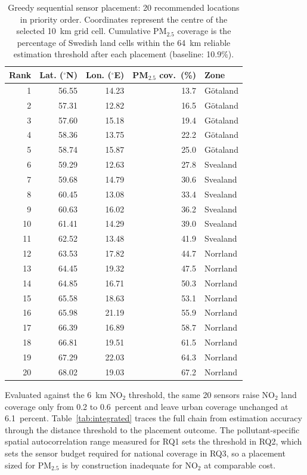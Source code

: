 \documentclass[conference]{IEEEtran}
\begin{document}
\begin{table}[!ht]
\caption{Greedy sequential sensor placement: 20 recommended locations in
priority order. Coordinates represent the centre of the selected 10~km grid
cell. Cumulative PM$_{2.5}$ coverage is the percentage of Swedish land cells
within the 64~km reliable estimation threshold after each placement
(baseline: 10.9\%).}
\label{tab:placement-coords}
\centering
\footnotesize
\begin{tabular}{@{}rrrrl@{}}
\toprule
\textbf{Rank} & \textbf{Lat. ($^\circ$N)} & \textbf{Lon. ($^\circ$E)} & \textbf{PM$_{2.5}$ cov.\ (\%)} & \textbf{Zone} \\
\midrule
1  & 56.55 & 14.23 & 13.7 & G\"otaland \\
2  & 57.31 & 12.82 & 16.5 & G\"otaland \\
3  & 57.60 & 15.18 & 19.4 & G\"otaland \\
4  & 58.36 & 13.75 & 22.2 & G\"otaland \\
5  & 58.74 & 15.87 & 25.0 & G\"otaland \\
6  & 59.29 & 12.63 & 27.8 & Svealand \\
7  & 59.68 & 14.79 & 30.6 & Svealand \\
8  & 60.45 & 13.08 & 33.4 & Svealand \\
9  & 60.63 & 16.02 & 36.2 & Svealand \\
10 & 61.41 & 14.29 & 39.0 & Svealand \\
11 & 62.52 & 13.48 & 41.9 & Svealand \\
12 & 63.53 & 17.82 & 44.7 & Norrland \\
13 & 64.45 & 19.32 & 47.5 & Norrland \\
14 & 64.85 & 16.71 & 50.3 & Norrland \\
15 & 65.58 & 18.63 & 53.1 & Norrland \\
16 & 65.98 & 21.19 & 55.9 & Norrland \\
17 & 66.39 & 16.89 & 58.7 & Norrland \\
18 & 66.81 & 19.51 & 61.5 & Norrland \\
19 & 67.29 & 22.03 & 64.3 & Norrland \\
20 & 68.02 & 19.03 & 67.2 & Norrland \\
\bottomrule
\end{tabular}
\end{table}
\FloatBarrier

Evaluated against the 6~km NO$_2$ threshold, the same 20 sensors raise NO$_2$
land coverage only from 0.2 to 0.6~percent and leave urban coverage unchanged
at 6.1~percent. Table~\ref{tab:integrated} traces the full chain from
estimation accuracy through the distance threshold to the placement outcome.
The pollutant-specific spatial autocorrelation range measured for RQ1 sets the
threshold in RQ2, which sets the sensor budget required for national coverage
in RQ3, so a placement sized for PM$_{2.5}$ is by construction inadequate for
NO$_2$ at comparable cost.
\end{document}
